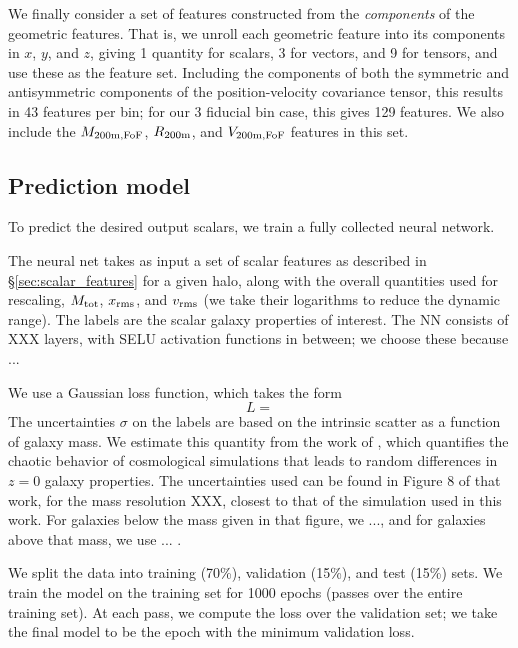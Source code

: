 We finally consider a set of features constructed from the \emph{components} of the geometric features.
That is, we unroll each geometric feature into its components in $x$, $y$, and $z$, giving 1 quantity for scalars, 3 for vectors, and 9 for tensors, and use these as the feature set. 
Including the components of both the symmetric and antisymmetric components of the position-velocity covariance tensor, this results in 43 features per bin; for our 3 fiducial bin case, this gives 129 features.
We also include the $M_\mathrm{200m,FoF}$, $R_\mathrm{200m}$, and $V_\mathrm{200m,FoF}$ features in this set.


\subsection{Prediction model}
\label{sec:prediction_model}

To predict the desired output scalars, we train a fully collected neural network.

The neural net takes as input a set of scalar features as described in \S\ref{sec:scalar_features} for a given halo, along with the overall quantities used for rescaling, $M_\mathrm{tot}$, $x_\mathrm{rms}$, and $v_\mathrm{rms}$ (we take their logarithms to reduce the dynamic range).
The labels are the scalar galaxy properties of interest.
The NN consists of XXX layers, with SELU activation functions in between; we choose these because ... 

We use a Gaussian loss function, which takes the form
\begin{equation}
    L = 
\end{equation}
The uncertainties $\sigma$ on the labels are based on the intrinsic scatter as a function of galaxy mass.
We estimate this quantity from the work of \cite{Genel2019}, which quantifies the chaotic behavior of cosmological simulations that leads to random differences in $z=0$ galaxy properties.
The uncertainties used can be found in Figure 8 of that work, for the mass resolution XXX, closest to that of the simulation used in this work.
For galaxies below the mass given in that figure, we ..., and for galaxies above that mass, we use ... .


We split the data into training (70\%), validation (15\%), and test (15\%) sets.
We train the model on the training set for 1000 epochs (passes over the entire training set).
At each pass, we compute the loss over the validation set; we take the final model to be the epoch with the minimum validation loss. 

